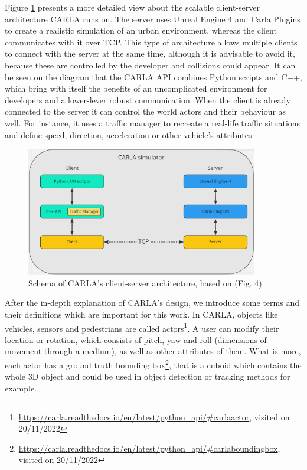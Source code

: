 Figure \ref{fig:carla_arch} presents a more detailed view about the scalable client-server architecture CARLA runs on. The server uses Unreal Engine 4 and Carla Plugins to create a realistic simulation of an urban environment, whereas the client communicates with it over TCP. This type of architecture allows multiple clients to connect with the server at the same time, although it is advisable to avoid it, because these are controlled by the developer and collisions could appear. It can be seen on the diagram that the CARLA API combines Python scripts and C++, which bring with itself the benefits of an uncomplicated environment for developers and a lower-lever robust communication. When the client is already connected to the server it can control the world actors and their behaviour as well. For instance, it uses a traffic manager to recreate a real-life traffic situations and define speed, direction, acceleration or other vehicle's attributes.

\begin{figure} [h]
\centering
\includegraphics[width = 0.9\textwidth]{images/carla_arch.png}
\caption[CARLA's architecture]{Schema of CARLA's client-server architecture, based on \cite{carla_architecture} (Fig. 4) \label{fig:carla_arch}}
\end{figure}

After the in-depth explanation of CARLA's design, we introduce some terms and their definitions which are important for this work. In CARLA, objects like vehicles, sensors and pedestrians are called actors\footnote{\url{https://carla.readthedocs.io/en/latest/python_api/\#carlaactor}, visited on 20/11/2022}. A user can modify their location or rotation, which consists of pitch, yaw and roll (dimensions of movement through a medium), as well as other attributes of them. What is more, each actor has a ground truth bounding box\footnote{\url{https://carla.readthedocs.io/en/latest/python_api/\#carlaboundingbox}, visited on 20/11/2022}, that is a cuboid which contains the whole 3D object and could be used in object detection or tracking methods for example. 

